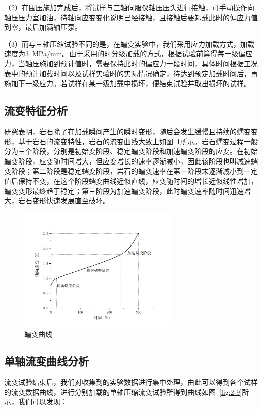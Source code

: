 （2）在围压施加完成后，将试样与三轴伺服仪轴压压头进行接触，可手动操作向轴压压力室加油，待轴向应变变化说明已经接触，且接触后要卸载此时的偏应力值到零，最后加满轴压泵。

（3）而与三轴压缩试验不同的是，在蠕变实验中，我们采用应力加载方式，加载速度为\SI{3}{MPa/min}。由于采用的时分级加载的方式，根据试验前算得每一级偏应力，当轴压施加到预计值时，需要保持此时的偏应力一段时间，具体时间根据工况表中的预计加载时间以及试样实验时的实际情况确定，待达到预定加载时间后，再施加下一级应力。若试样在某一级加载中损坏，便结束试验并取出损坏的试样。


\subsection{流变特征分析}
研究表明，岩石除了在加载瞬间产生的瞬时变形，随后会发生缓慢且持续的蠕变变形，基于岩石的流变特性，岩石的流变曲线大致上如图~\ref{fig:2-8}所示。岩石蠕变过程一般分为三个阶段，分别是初始变阶段、稳定蠕变阶段和加速蠕变阶段的应变。在初始蠕变阶段，应变随时间增大，但应变增长的速率逐渐减小，因此该阶段也叫减速蠕变阶段；第二阶段是稳定蠕变阶段，岩石的蠕变速率在第一阶段末逐渐减小到一定值后保持不变，在这个阶段蠕变曲线近似直线，应变随时间的增长近似线性增加，蠕变变形最终趋于稳定；第三阶段为加速蠕变阶段，此时蠕变速率随时间迅速增大，岩石变形快速发展直至破坏。

\begin{figure}[ht!]
    \centering
        \includegraphics[width=0.7\textwidth]{img/chap2/Creep curve.png}
    \caption{蠕变曲线}
    \label{fig:2-8}
\end{figure}

\subsection{单轴流变曲线分析}

流变试验结束后，我们对收集到的实验数据进行集中处理，由此可以得到各个试样的流变数据曲线，进行分别加载的单轴压缩流变试验所得到曲线如图~\ref{fig:2-9}所示，我们可以发现：

